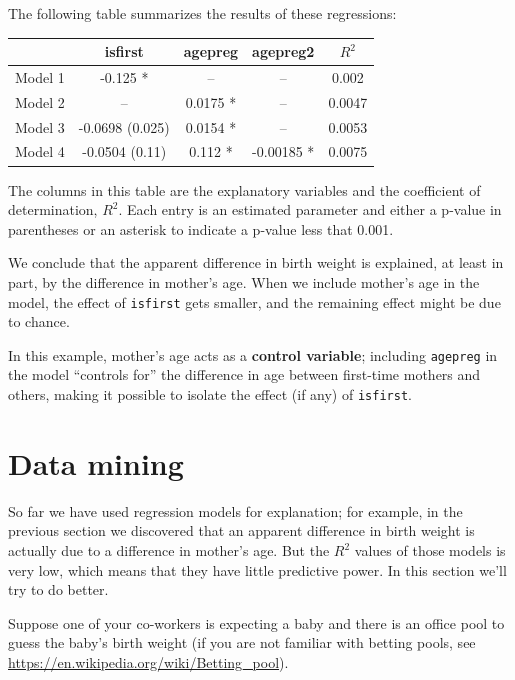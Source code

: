 \documentclass[12pt]{book}
\theoremstyle{exercise}
\begin{document}
The following table summarizes the results of these regressions:

\begin{center}
\begin{tabular}{|l|c|c|c|c|}
\hline & isfirst & agepreg & agepreg2 & $R^2$ \\ \hline
Model 1 & -0.125 * & -- & -- & 0.002 \\
Model 2 & -- & 0.0175 * & -- & 0.0047 \\
Model 3 & -0.0698 (0.025) & 0.0154 * & -- & 0.0053 \\
Model 4 & -0.0504 (0.11) & 0.112 * & -0.00185 * & 0.0075 \\
\hline
\end{tabular}
\end{center}

The columns in this table are the explanatory variables and
the coefficient of determination, $R^2$.  Each entry is an estimated
parameter and either a p-value in parentheses or an asterisk to
indicate a p-value less that 0.001.%
%
%
%

We conclude that the apparent difference in birth weight
is explained, at least in part, by the difference in mother's age.
When we include mother's age in the model, the effect of
{\tt isfirst} gets smaller, and the remaining effect might be
due to chance.%

In this example, mother's age acts as a {\bf control variable};
including {\tt agepreg} in the model ``controls for'' the
difference in age between first-time mothers and others, making
it possible to isolate the effect (if any) of {\tt isfirst}.%


\section{Data mining}%
\label{mining}

So far we have used regression models for explanation; for example,
in the previous section we discovered that an apparent difference
in birth weight is actually due to a difference in mother's age.
But the $R^2$ values of those models is very low, which means that
they have little predictive power.  In this section we'll try to
do better.%
%
%
%
%

Suppose one of your co-workers is expecting a baby and
there is an office pool to guess the baby's birth weight (if you are
not familiar with betting pools, see
\url{https://en.wikipedia.org/wiki/Betting_pool}).%
\end{document}
